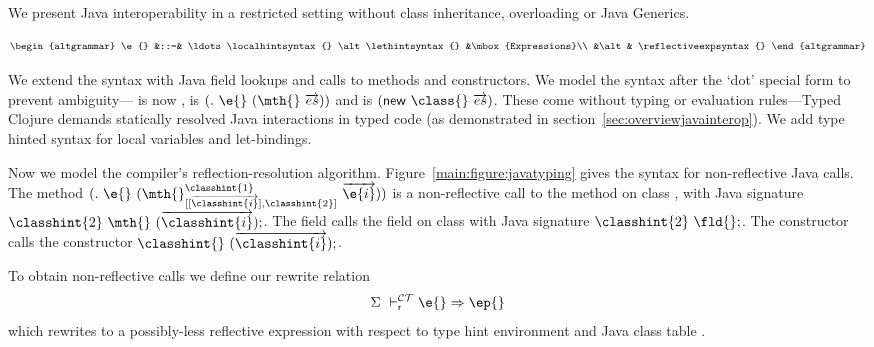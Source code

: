 We present Java interoperability in a restricted setting without class inheritance,
overloading or Java Generics.

  $$
  \begin{altgrammar}
    \e{} &::=& \ldots   \localhintsyntax{} \alt \lethintsyntax{} &\mbox{Expressions}\\
            &\alt& \reflectiveexpsyntax{} 
  \end{altgrammar}
  $$

We extend the syntax with Java field lookups and calls to
methods and constructors. We model the syntax after the `dot' special
form to prevent ambiguity--- is now \fieldexp{\fld{}}{\e{}},
 is $\methodexp{\mth{}}{\e{}}{\overrightarrow{es}}$
and  is $\newexp{\class{}}{\overrightarrow{es}}$.
These come without typing or evaluation rules---Typed Clojure 
demands statically resolved Java interactions
in typed code
(as demonstrated in section~\ref{sec:overviewjavainterop}).
We add type hinted syntax for local variables and let-bindings.

Now we model the compiler's reflection-resolution algorithm.
Figure~\ref{main:figure:javatyping} gives the syntax for non-reflective Java calls.
The method ${\methodstaticexp {\classhint{1}}
                             {\overrightarrow {\classhint{i}}}
                             {\classhint{2}}
                             {\mth{}} {\e{}} {\overrightarrow{\e{i}}}}$
is a non-reflective call to the \mth{} method on class {}, 
with Java signature 
${\classhint{2}}\ \mth{}\ (\overrightarrow {\classhint{i}});$.
The field { {} {\fld{}} {\e{}}}
calls the field on class {} with Java signature
${\classhint{2}}\ \fld{};$.
The constructor { {\classhint{}} 
                               {\class{}} {}}
calls the constructor
${\classhint{}}\ ({\overrightarrow{\classhint{i}}});$.

%


To obtain non-reflective calls we define our rewrite relation
$$
\rewrite {\taenv{}} {\e{}} {\ep{}}
$$
which rewrites \e{} to a possibly-less reflective expression
\ep{} with respect to type hint environment
\taenv{} and Java class table \ct{}.

